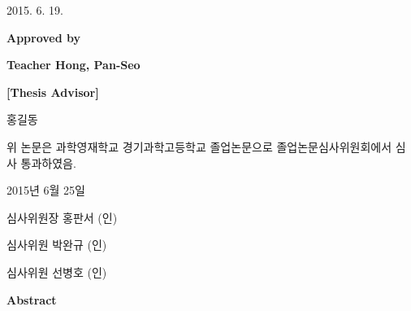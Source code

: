 \documentclass[11pt]{article}
\begin{document}
	\vspace{7mm}
	\begin{flushright}
		2015. 6. 19.
	\end{flushright}
	
	\setlength{\parindent}{60mm}
	\Large
	\textbf{Approved by}
	
	\textbf{Teacher Hong, Pan-Seo}
	
	\textbf{[Thesis Advisor]}
	\setlength{\parindent}{0mm}
	
	
	\setlength\parindent{15pt}
	
	\newpage
	
	\begin{center}
		\huge{\ttitleko}
		
		\vspace{20mm}
		\LARGE{홍길동}
		
		\vspace{30mm}
		\Large
		위 논문은 과학영재학교 경기과학고등학교 졸업논문으로 졸업논문심사위원회에서 심사 통과하였음.
		
	\end{center}
	\vspace{20mm}
	\begin{flushright}
		2015년 6월 25일
		
		\vspace{10mm}
		심사위원장 홍판서 (인)
		
		\vspace{10mm}
		심사위원 박완규 (인)
		
		\vspace{10mm}
		심사위원 선병호 (인)
		
	\end{flushright}
	
	\newcommand{\englishabs}{
		\newpage
		\begin{center}
			\begin{LARGE}
				\ttitle
			\end{LARGE}
		\end{center}
		\vspace{40mm}
		
		\begin{center}
			\LARGE{\textbf{Abstract}}
		\end{center}
		
		\vspace*{15mm}
		
		\abstracten
	}
	
	
	\englishabs
	
\end{document}
